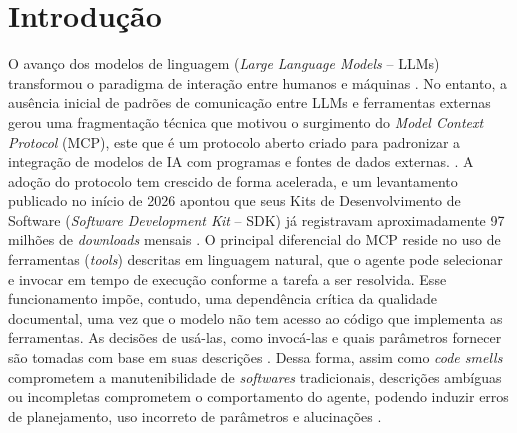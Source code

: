 \section{Introdução}
\label{sec:introducao}

O avanço dos modelos de linguagem (\textit{Large Language Models} -- LLMs) transformou o paradigma de interação entre humanos e máquinas \cite{mcpAtFirstGlance}. No entanto, a ausência inicial de padrões de comunicação entre LLMs e ferramentas externas gerou uma fragmentação técnica que motivou o surgimento do \textit{Model Context Protocol} (MCP), este que é um protocolo aberto criado para padronizar a integração de modelos de IA com programas e fontes de dados externas. \cite{shi2026description}. A adoção do protocolo tem crescido de forma acelerada, e um levantamento publicado no início de 2026 apontou que seus Kits de Desenvolvimento de Software (\textit{Software Development Kit} -- SDK) já registravam aproximadamente 97 milhões de \textit{downloads} mensais \cite{Avaya2026}. O principal diferencial do MCP reside no uso de ferramentas (\textit{tools}) descritas em linguagem natural, que o agente pode selecionar e invocar em tempo de execução conforme a tarefa a ser resolvida. Esse funcionamento impõe, contudo, uma dependência crítica da qualidade documental, uma vez que o modelo não tem acesso ao código que implementa as ferramentas. As decisões de usá-las, como invocá-las e quais parâmetros fornecer são tomadas com base em suas descrições \cite{shi2026description, 2025arXiv250814704L}. Dessa forma, assim como \textit{code smells} comprometem a manutenibilidade de \textit{softwares} tradicionais, descrições ambíguas ou incompletas comprometem o comportamento do agente, podendo induzir erros de planejamento, uso incorreto de parâmetros e alucinações \cite{2026arXiv260214878M}.


